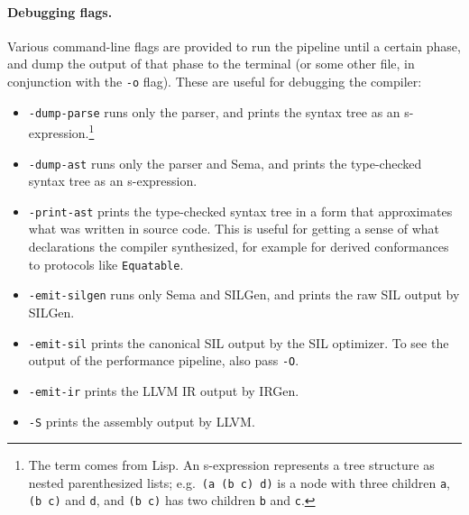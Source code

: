\documentclass[../generics]{subfiles}
\begin{document}
\begin{figure}\label{compilerpipeline}
\begin{center}
\end{center}
\end{figure}

\paragraph{Debugging flags.}
Various command-line flags are provided to run the pipeline until a certain phase, and dump the output of that phase to the terminal (or some other file, in conjunction with the \texttt{-o} flag). These are useful for debugging the compiler:
\begin{itemize}
\item {}\texttt{-dump-parse} runs only the parser, and prints the syntax tree as an s-expression.\footnote{The term comes from Lisp. An s-expression represents a tree structure as nested parenthesized lists; e.g.\ \texttt{(a (b c) d)} is a node with three children \texttt{a}, \texttt{(b c)} and \texttt{d}, and \texttt{(b c)} has two children \texttt{b} and \texttt{c}.}
\item {}\texttt{-dump-ast} runs only the parser and Sema, and prints the type-checked syntax tree as an s-expression.
\item {}\texttt{-print-ast} prints the type-checked syntax tree in a form that approximates what was written in source code. This is useful for getting a sense of what declarations the compiler synthesized, for example for derived conformances to protocols like \texttt{Equatable}.
\item {}\texttt{-emit-silgen} runs only Sema and SILGen, and prints the raw SIL output by SILGen.
\item {}\texttt{-emit-sil} prints the canonical SIL output by the SIL optimizer. To see the output of the performance pipeline, also pass \texttt{-O}.
\item {}\texttt{-emit-ir} prints the LLVM IR output by IRGen.
\item {}\texttt{-S} prints the assembly output by LLVM.
\end{itemize}
\end{document}
